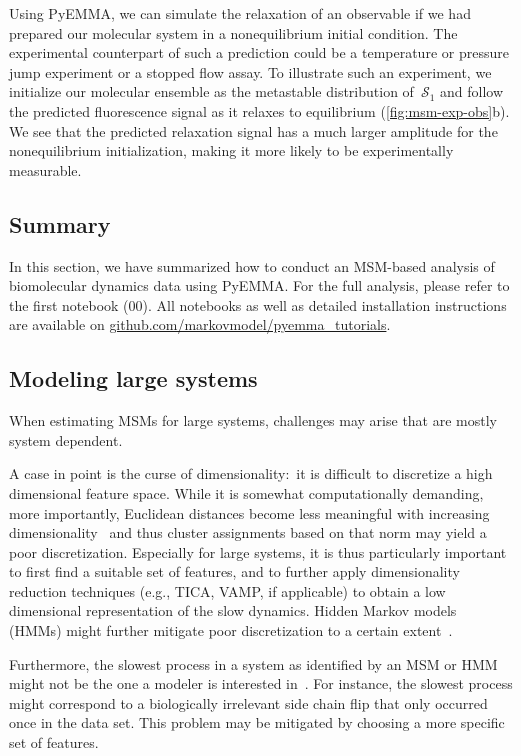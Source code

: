 \documentclass[9pt,tutorial]{livecoms}
\newcommand{\githubrepository}{\url{github.com/markovmodel/pyemma_tutorials}}
\begin{document}
Using PyEMMA, we can simulate the relaxation of an observable if we had prepared our molecular system in a nonequilibrium initial condition.
The experimental counterpart of such a prediction could be a temperature or pressure jump experiment or a stopped flow assay.
To illustrate such an experiment, we initialize our molecular ensemble as the metastable distribution of~$\mathcal{S}_1$
and follow the predicted fluorescence signal as it relaxes to equilibrium (\ref{fig:msm-exp-obs}b).
We see that the predicted relaxation signal has a much larger amplitude for the nonequilibrium initialization,
making it more likely to be experimentally measurable.

\subsection{Summary}

In this section, we have summarized how to conduct an MSM-based analysis of biomolecular dynamics data using PyEMMA.
For the full analysis, please refer to the first notebook (00).
All notebooks as well as detailed installation instructions are available on \githubrepository{}.

\subsection{Modeling large systems}

When estimating MSMs for large systems, challenges may arise that are mostly system dependent.

A case in point is the curse of dimensionality:~it is difficult to discretize a high dimensional feature space.
While it is somewhat computationally demanding, more importantly,
Euclidean distances become less meaningful with increasing dimensionality~\cite{aggarwal_surprising_2001}
and thus cluster assignments based on that norm may yield a poor discretization.
Especially for large systems, it is thus particularly important to first find a suitable set of features,
and to further apply dimensionality reduction techniques (e.g., TICA, VAMP, if applicable)
to obtain a low dimensional representation of the slow dynamics.
Hidden Markov models (HMMs) might further mitigate poor discretization to a certain extent~\cite{noe-proj-hid-msm}.

Furthermore, the slowest process in a system as identified by an MSM or HMM might not be the one a modeler is interested in~\cite{banushkina_nonparametric_2015}.
For instance, the slowest process might correspond to a biologically irrelevant side chain flip that only occurred once in the data set.
This problem may be mitigated by choosing a more specific set of features.
\end{document}
